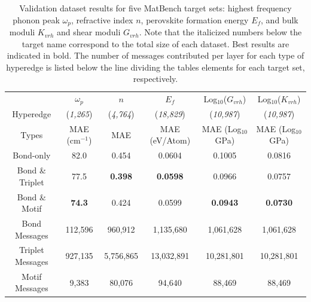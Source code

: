 \documentclass[10pt,a4paper,twocolumn]{article}
\begin{document}



\begin{table}\small
	\begin{tabular*}{\textwidth}{@{\extracolsep{\fill}}cccccc}
		\hline 
		$\quad$ & $\omega_p$  & $n$  & $E_f$  & Log$_{10}$($G_{vrh}$) & Log$_{10}$($K_{vrh}$) \\
		Hyperedge & (\textit{1,265}) &  (\textit{4,764}) & (\textit{18,829}) & (\textit{10,987}) & (\textit{10,987}) \\
		Types & MAE (cm$^{-1}$) & MAE & MAE (eV/Atom)& MAE (Log$_{10}$GPa)& MAE (Log$_{10}$GPa)  \\
		\hline
		Bond-only & 82.0& 0.454 & 0.0604 & 0.1005 & 0.0816\\
		Bond \& Triplet & 77.5& \textbf{0.398} & \textbf{0.0598} & 0.0966 & 0.0757 \\
		Bond \& Motif & \textbf{74.3}& 0.424 & 0.0599 & \textbf{0.0943} & \textbf{0.0730}\\
		\hline
		Bond Messages & 112,596 & 960,912 & 1,135,680 & 1,061,628 & 1,061,628\\
		Triplet Messages & 927,135 &5,756,865& 13,032,891 & 10,281,801  & 10,281,801\\
		Motif Messages & 9,383 & 80,076 & 94,640 & 88,469 & 88,469 \\
		\hline
	\end{tabular*}
	\caption{Validation dataset results for five MatBench target sets: highest frequency phonon peak $\omega_p$, refractive index $n$, perovskite formation energy $E_f$, and bulk moduli $K_{vrh}$ and shear moduli $G_{vrh}$. Note that the italicized numbers below the target name correspond to the total size of each dataset. Best results are indicated in bold. The number of messages contributed per layer for each type of hyperedge is listed below the line dividing the tables elements for each target set, respectively. }\label{fig:matbench_table}
\end{table}
\end{document}
